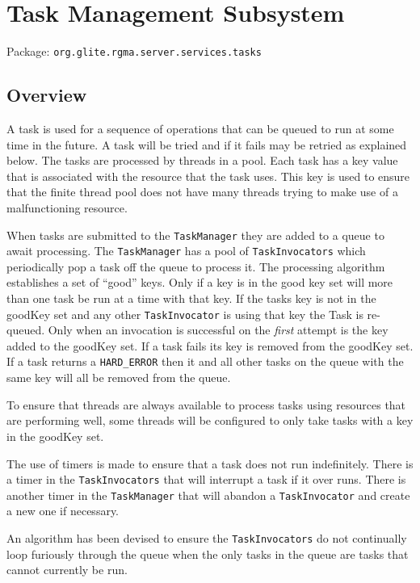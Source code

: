 \section{Task Management Subsystem}
\label{sec:taskManagementSubsystem}

Package: \texttt{org.glite.rgma.server.services.tasks}

\subsection{Overview}
A task is used for a sequence of operations that can be queued to run at some 
time in the future. A task will be tried and if it fails may be retried as 
explained below.  The tasks are processed by threads in a pool. Each task has a 
key value that is associated with the resource that the task uses. This key is 
used to ensure that the finite thread pool does not have many threads trying to 
make use of a malfunctioning resource.

When tasks are submitted to the \texttt{TaskManager} they are added to a queue 
to await processing. The \texttt{TaskManager} has a pool of 
\texttt{TaskInvocators} which periodically pop a task off the queue to process 
it.  The processing algorithm establishes a set of ``good'' keys. Only if a key 
is in the good key set will more than one task be run at a time with that key. 
If the tasks key is not in the goodKey set and any other \texttt{TaskInvocator} 
is using that key the Task is re-queued.  Only when an invocation is successful 
on the \textit{first} attempt is the key added to the goodKey set. If a task 
fails its key is removed from the goodKey set. If a task returns a 
\texttt{HARD\_ERROR} then it and all other tasks on the queue with the same key 
will all be removed from the queue.

To ensure that threads are always available to process tasks using resources 
that are performing well, some threads will be configured to only take tasks 
with a key in the goodKey set.

The use of timers is made to ensure that a task does not run indefinitely. 
There is a timer in the \texttt{TaskInvocators} that will interrupt a task if 
it over runs. There is another timer in the \texttt{TaskManager} that will 
abandon a \texttt{TaskInvocator} and create a new one if necessary.

An algorithm has been devised to ensure the \texttt{TaskInvocators} do not 
continually loop furiously through the queue when the only tasks in the queue 
are tasks that cannot currently be run.

